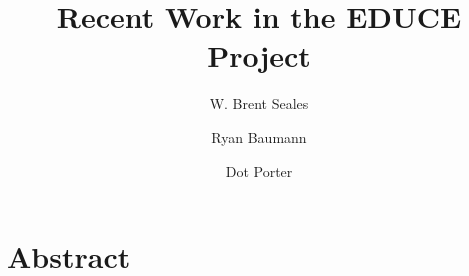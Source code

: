 \documentclass[12pt]{article}
\begin{document}
\title{Recent Work in the EDUCE Project}
\author{W. Brent Seales
\and Ryan Baumann \\
\and Dot Porter}
\date{}

\maketitle

\section{Abstract}
\end{document}
